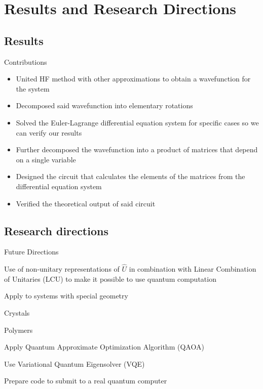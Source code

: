 \documentclass[professionalfonts]{beamer}
\newcommand{\SubItem}[1]{
    {\setlength\itemindent{15pt} \item[*] #1}
}
\begin{document}
\section{\textbf{Results and Research Directions}}

\subsection{Results}

\begin{frame}{Contributions}
	\begin{itemize}
		\item United HF method with other approximations to obtain a wavefunction for the system
		\item Decomposed said wavefunction into elementary rotations

		\item Solved the Euler-Lagrange differential equation system for specific cases so we can verify our results

		\item Further decomposed the wavefunction into a product of matrices that depend on a single variable

		\item Designed the circuit that calculates the elements of the matrices from the differential equation system

		\item Verified the theoretical output of said circuit
	\end{itemize}
\end{frame}

\subsection{Research directions}

\begin{frame}{Future Directions}
	\begin{itemize}
		\item Use of non-unitary representations of $\hat U$ in combination with Linear Combination of Unitaries (LCU) to make it possible to use quantum computation
		\item Apply to systems with special geometry
			\SubItem{Crystals}
			\SubItem{Polymers}
		\item Apply Quantum Approximate Optimization Algorithm (QAOA)
		\item Use Variational Quantum Eigensolver (VQE)
		\item Prepare code to submit to a real quantum computer
	\end{itemize}
\end{frame}
\end{document}

